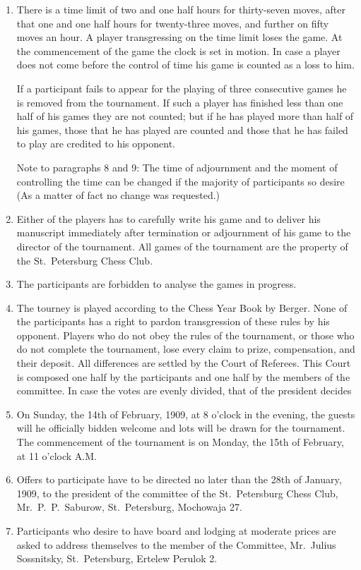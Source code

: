 \begin{enumerate}
\item There is a time limit of two and one half hours for thirty-seven moves, after that one and one half hours for twenty-three moves, and further on fifty moves an hour. A player transgressing on the time limit loses the game. At the commencement of the game the clock is set in motion. In case a player does not come before the control of time his game is counted as a loss to him.

If a participant fails to appear for the playing of three consecutive games he is removed from the tournament. If such a player has finished less than one half of his games they are not counted; but if he has played more than half of his games, those that he has played are counted and those that he has failed to play are credited to his opponent.

Note to paragraphs 8 and 9: The time of adjournment and the moment of controlling the time can be changed if the majority of participants so desire (As a matter of fact no change was requested.)

\item Either of the players has to carefully write his game and to deliver his manuscript immediately after termination or adjournment of his game to the director of the tournament. All games of the tournament are the property of the St.~Petersburg Chess Club.

\item The participants are forbidden to analyse the games in progress.

\item The tourney is played according to the Chess Year Book by Berger. None of the participants has a right to pardon transgression of these rules by his opponent. Players who do not obey the rules of the tournament, or those who do not complete the tournament, lose every claim to prize, compensation, and their deposit. All differences are settled by the Court of Referees. This Court is composed one half by the participants and one half by the members of the committee. In case the votes are evenly divided, that of the president decides

\item On Sunday, the 14th of February, 1909, at 8 o'clock in the evening, the guests will he officially bidden welcome and lots will be drawn for the tournament. The commencement of the tournament is on Monday, the 15th of February, at 11 o'clock A.M.

\item Offers to participate have to be directed no later than the 28th of January, 1909, to the president of the committee of the St.~Petersburg Chess Club, Mr.~P.~P.~Saburow, St.~Petersburg, Mochowaja 27.

\item Participants who desire to have board and lodging at moderate prices are asked to address themselves to the member of the Committee, Mr.~Julius Sossnitsky, St.~Petersburg, Ertelew Perulok 2.
\end{enumerate}


